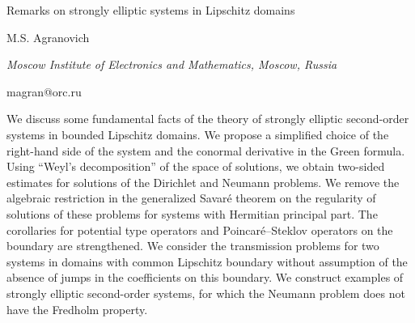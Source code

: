 \documentclass[10pt,a4paper]{article}
\begin{document}
\begin{center}

{\Large Remarks on strongly elliptic systems in Lipschitz domains}

\bigskip

{\sc M.S. Agranovich}

{\small\it Moscow Institute of Electronics and Mathematics, Moscow, Russia}

{\small\rm magran@orc.ru}

\end{center}

\bigskip

We discuss some fundamental facts of the theory of strongly elliptic
second-order systems in bounded Lipschitz domains. We propose a simplified
choice of the right-hand side of the system and the conormal derivative in the
Green formula. Using ``Weyl's decomposition'' of the space of solutions, we
obtain two-sided estimates for solutions of the Dirichlet and Neumann problems.
We remove the algebraic restriction in the generalized Savar\'e theorem on the
regularity of solutions of these problems for systems with Hermitian principal
part. The corollaries for potential type operators and Poincar\'e--Steklov
operators on the boundary are strengthened. We consider the transmission
problems for two systems in domains with common Lipschitz boundary without
assumption of the absence of jumps in the coefficients on this boundary. We
construct examples of strongly elliptic second-order systems, for which the
Neumann problem does not have the Fredholm property.
\end{document}
